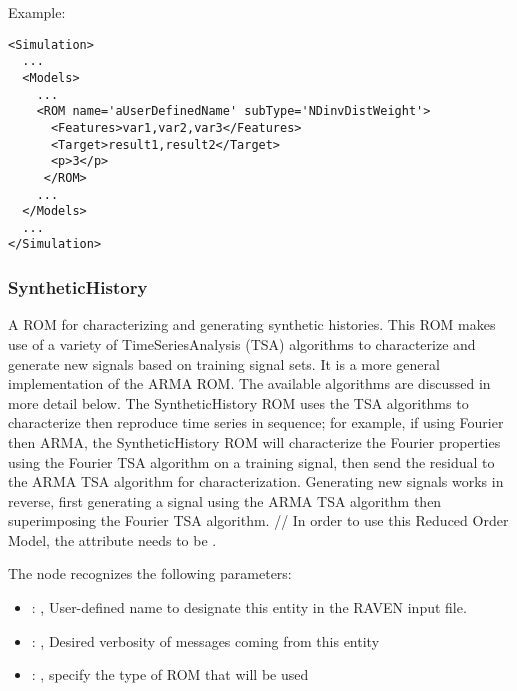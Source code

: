 \hspace{24pt}
Example:
\begin{lstlisting}[style=XML,morekeywords={name,subType}]
<Simulation>
  ...
  <Models>
    ...
    <ROM name='aUserDefinedName' subType='NDinvDistWeight'>
      <Features>var1,var2,var3</Features>
      <Target>result1,result2</Target>
      <p>3</p>
     </ROM>
    ...
  </Models>
  ...
</Simulation>
\end{lstlisting}


\subsubsection{SyntheticHistory}
  A ROM for characterizing and generating synthetic histories. This ROM makes use of         a
  variety of TimeSeriesAnalysis (TSA) algorithms to characterize and generate new         signals
  based on training signal sets. It is a more general implementation of the ARMA ROM. The available
  algorithms are discussed in more detail below. The SyntheticHistory ROM uses the TSA algorithms to
  characterize then reproduce time series in sequence; for example, if using Fourier then ARMA, the
  SyntheticHistory ROM will characterize the Fourier properties using the Fourier TSA algorithm on a
  training signal, then send the residual to the ARMA TSA algorithm for characterization. Generating
  new signals works in reverse, first generating a signal using the ARMA TSA algorithm then
  superimposing the Fourier TSA algorithm.         //         In order to use this Reduced Order
  Model, the  attribute          needs to be
  .

  The  node recognizes the following parameters:
    \begin{itemize}
      \item {}: ,
        User-defined name to designate this entity in the RAVEN input file.
      \item {}: ,
        Desired verbosity of messages coming from this entity
      \item {}: ,
        specify the type of ROM that will be used
  \end{itemize}

